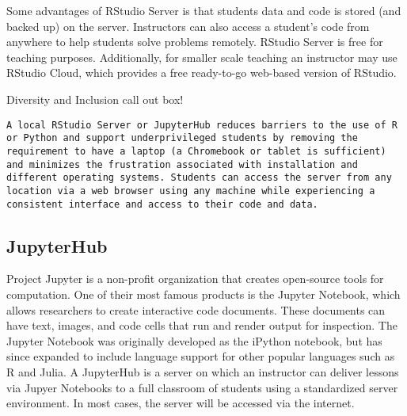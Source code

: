 Some advantages of RStudio Server is that students data and code is stored (and backed up) on the server. 
Instructors can also access a student's code from anywhere to help students solve problems remotely.
RStudio Server is free for teaching purposes.
Additionally, for smaller scale teaching an instructor may use RStudio Cloud, which provides a free ready-to-go web-based version of RStudio.

{\begin{framed}
Diversity and Inclusion call out box! 
\begin{snugshade*}
\begin{lstlisting}
A local RStudio Server or JupyterHub reduces barriers to the use of R or Python and support underprivileged students by removing the requirement to have a laptop (a Chromebook or tablet is sufficient) and minimizes the frustration associated with installation and different operating systems. Students can access the server from any location via a web browser using any machine while experiencing a consistent interface and access to their code and data. 
\end{lstlisting}
\end{snugshade*}
\end{framed}}

\subsection{JupyterHub}\label{JupyterHub}

Project Jupyter is a non-profit organization that creates open-source tools for computation.
One of their most famous products is the Jupyter Notebook, which allows researchers to create interactive code documents.
These documents can have text, images, and code cells that run and render output for inspection.
The Jupyter Notebook was originally developed as the iPython notebook, but has since expanded to include language support for other popular languages such as R and Julia.
A JupyterHub is a server on which an instructor can deliver lessons via Jupyer Notebooks to a full classroom of students using a standardized server environment.
In most cases, the server will be accessed via the internet.

